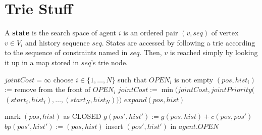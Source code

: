 \documentclass[letterpaper]{article}
\begin{document}
\section{Trie Stuff}
A \textbf{state} is the search space of agent $i$ is an ordered pair $(v, seq)$ of vertex $v\in V_i$ and history sequence $seq$. States are accessed by following a trie according to the sequence of constraints named in $seq$. Then, $v$ is reached simply by looking it up in a map stored in $seq$'s trie node.

\begin{algorithm}
\caption{$search()$}
\label{alg:update}
\begin{algorithmic}
\STATE $jointCost = \infty$
\STATE choose $i\in\{1,\ldots,N\}$ such that $OPEN_{i}$ is not empty
\STATE $(pos, hist_i)$ := remove from the front of $OPEN_{i}$
\STATE $jointCost := \min(jointCost,jointPriority($\\\qquad$(start_i,hist_i),\ldots,(start_N,hist_N)))$
\ENDFOR
\ENDIF
\STATE $expand(pos, hist)$
\ENDWHILE
\end{algorithmic}
\end{algorithm}

\begin{algorithm}
\caption{$expand(pos, hist)$}
\label{alg:update}
\begin{algorithmic}
\STATE mark $(pos, hist)$ as CLOSED
\STATE $g(pos', hist') := g(pos, hist) + c(pos, pos')$
\STATE $bp(pos', hist') := (pos, hist)$
\STATE insert $(pos', hist')$ in $agent.OPEN$
\ENDIF
\ENDIF
\ENDFOR
\end{algorithmic}
\end{algorithm}

\begin{comment}

\begin{algorithm}
\caption{$MultiAgent A^*HighLevel()$}
\label{alg:update}
\begin{algorithmic}
\STATE $\forall i:\; s_i := start_i$
\WHILE {$g(goal_1, \ldots, goal_N) > f(s_1,\ldots,s_N)$}
\STATE $\forall i:\; expand(s_i)$
\STATE $(s_1,\ldots,s_N) = \arg\min_{s_1,\ldots,s_N} f(s_1,\ldots,s_N)$
\ENDWHILE
\end{algorithmic}
\end{algorithm}

\begin{algorithm}
\caption{$f(s)$}
\label{alg:update}
\begin{algorithmic}
\STATE $f := \infty$
\FORALL {tuples $s_{1\ldots N}\in OPEN$ that include $s$}
\STATE $f := \min(f, jointPriority(s_{1\ldots N}))$
\ENDFOR
\RETURN $f$
\end{algorithmic}
\end{algorithm}

\end{comment}
\end{document}
